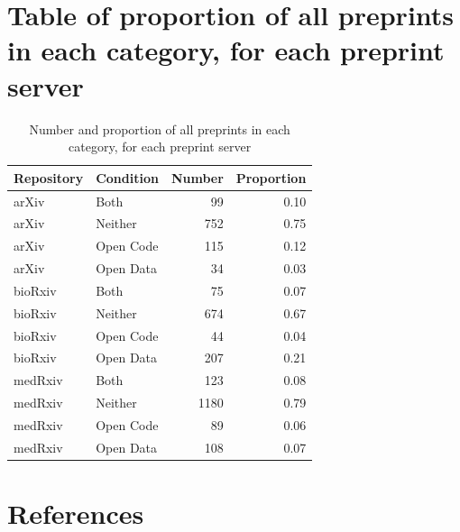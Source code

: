 \documentclass[
]{article}
\begin{document}
\hypertarget{table-of-proportion-of-all-preprints-in-each-category-for-each-preprint-server}{%
\section{Table of proportion of all preprints in each category, for each preprint server}\label{table-of-proportion-of-all-preprints-in-each-category-for-each-preprint-server}}

\begin{table}

\caption{\label{tab:propbyserverandcategory}Number and proportion of all preprints in each category, for each preprint server}
\centering
\begin{tabular}[t]{llrr}
\toprule
Repository & Condition & Number & Proportion\\
\midrule
arXiv & Both & 99 & 0.10\\
arXiv & Neither & 752 & 0.75\\
arXiv & Open Code & 115 & 0.12\\
arXiv & Open Data & 34 & 0.03\\
bioRxiv & Both & 75 & 0.07\\
bioRxiv & Neither & 674 & 0.67\\
bioRxiv & Open Code & 44 & 0.04\\
bioRxiv & Open Data & 207 & 0.21\\
medRxiv & Both & 123 & 0.08\\
medRxiv & Neither & 1180 & 0.79\\
medRxiv & Open Code & 89 & 0.06\\
medRxiv & Open Data & 108 & 0.07\\
\bottomrule
\end{tabular}
\end{table}

\newpage

\hypertarget{references}{%
\section*{References}\label{references}}
\end{document}
